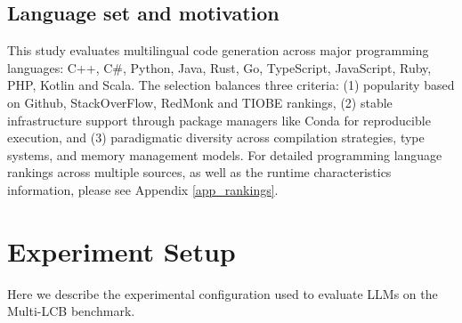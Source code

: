 \documentclass{llmxive}
\begin{document}
\subsection{Language set and motivation}

This study evaluates multilingual code generation across major programming languages: C++, C\#, Python, Java, Rust, Go, TypeScript, JavaScript, Ruby, PHP, Kotlin and Scala. The selection balances three criteria: (1) popularity based on Github, StackOverFlow, RedMonk and TIOBE rankings, (2) stable infrastructure support through package managers like Conda for reproducible execution, and (3) paradigmatic diversity across compilation strategies, type systems, and memory management models. For detailed programming language rankings across multiple sources, as well as the runtime characteristics information, please see Appendix \ref{app_rankings}.
















\section{Experiment Setup}
\label{sec_exp_setup}

Here we describe the experimental configuration used to evaluate LLMs on the Multi-LCB benchmark.  
\end{document}
